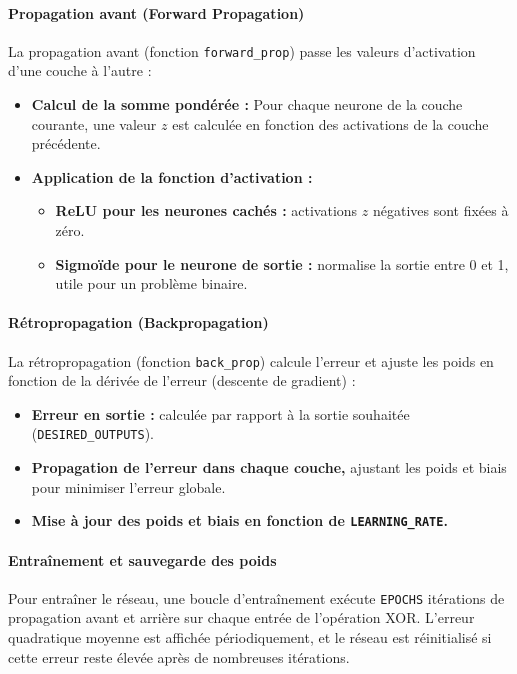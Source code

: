 \paragraph{Propagation avant (Forward Propagation)}

La propagation avant (fonction \texttt{forward\_prop}) passe les valeurs d’activation d’une couche à l’autre :

\begin{itemize}
    \item \textbf{Calcul de la somme pondérée :} Pour chaque neurone de la couche courante, une valeur \( z \) est calculée en fonction des activations de la couche précédente.
    \item \textbf{Application de la fonction d’activation :}
    \begin{itemize}
        \item \textbf{ReLU pour les neurones cachés :} activations \( z \) négatives sont fixées à zéro.
        \item \textbf{Sigmoïde pour le neurone de sortie :} normalise la sortie entre 0 et 1, utile pour un problème binaire.
    \end{itemize}
\end{itemize}

\paragraph{Rétropropagation (Backpropagation)}

La rétropropagation (fonction \texttt{back\_prop}) calcule l’erreur et ajuste les poids en fonction de la dérivée de l’erreur (descente de gradient) :

\begin{itemize}
    \item \textbf{Erreur en sortie :} calculée par rapport à la sortie souhaitée (\texttt{DESIRED\_OUTPUTS}).
    \item \textbf{Propagation de l’erreur dans chaque couche,} ajustant les poids et biais pour minimiser l’erreur globale.
    \item \textbf{Mise à jour des poids et biais en fonction de \texttt{LEARNING\_RATE}.}
\end{itemize}

\paragraph{Entraînement et sauvegarde des poids}

Pour entraîner le réseau, une boucle d’entraînement exécute \texttt{EPOCHS} itérations de propagation avant et arrière sur chaque entrée de l’opération XOR. L'erreur quadratique moyenne est affichée périodiquement, et le réseau est réinitialisé si cette erreur reste élevée après de nombreuses itérations.


